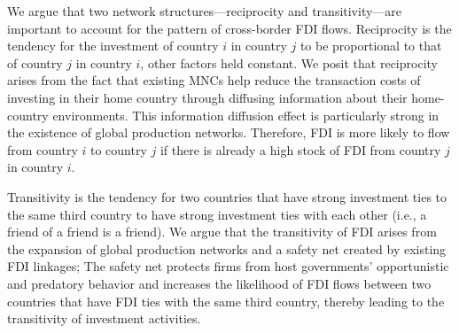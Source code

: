 \documentclass[reqno,onecolumn,letterpaper,12pt]{article}
\begin{document}

We argue that two network structures---reciprocity and transitivity---are important to account for the pattern of cross-border FDI flows. Reciprocity is the tendency for the investment of country $i$ in country $j$ to be proportional to that of country $j$ in country $i$, other factors held constant. We posit that reciprocity arises from the fact %
that existing MNCs help reduce the transaction costs of investing in their home country through diffusing information about their home-country environments. This information diffusion effect is particularly strong in the existence of global production networks. Therefore, FDI is more likely to flow from country $i$ to country $j$ if there is already a high stock of FDI from country $j$ in country $i$. %

Transitivity is the tendency for two countries that have strong investment ties to the same third country to have strong investment ties with each other (i.e., a friend of a friend is a friend). We argue that the transitivity of FDI arises from the expansion of global production networks and a safety net created by existing FDI linkages; The safety net protects firms from host governments' opportunistic and predatory behavior and increases the likelihood of FDI flows between two countries that have FDI ties with the same third country, thereby leading to the transitivity of investment activities. %
\end{document}
